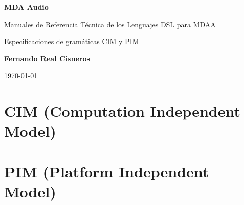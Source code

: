\documentclass[12pt,a4paper]{report}
\begin{document}
\begin{titlepage}
    \centering
    \vspace*{4cm}
    {\Huge \bfseries MDA Audio \par}
    \vspace{1.5cm}
    {\Large Manuales de Referencia Técnica de los Lenguajes DSL para MDAA \par}
    \vspace{1cm}
    {\large Especificaciones de gramáticas CIM y PIM \par}
    \vspace{2cm}
    {\Large \textbf{Fernando Real Cisneros} \par}
    \vfill
    {\large \today \par}
\end{titlepage}

\tableofcontents
\newpage




\chapter{CIM (Computation Independent Model)}



\chapter{PIM (Platform Independent Model)}





\end{document}
